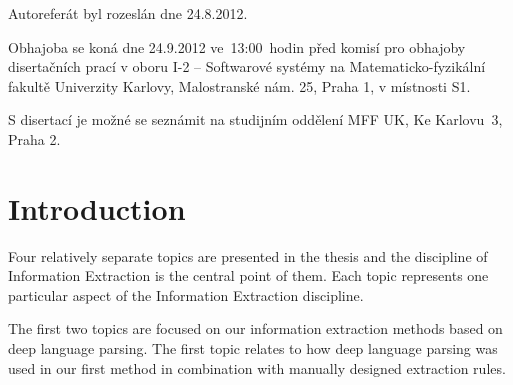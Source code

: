 \documentclass[12pt,a4paper,twoside,notitlepage]{article}
\begin{document}
\begin{tabular}{ll}
%
\end{tabular}

\vspace{4mm}

\noindent Autorefer\'{a}t byl rozesl\'{a}n dne 24.8.2012.

\noindent Obhajoba se kon\'{a} dne 24.9.2012 ve~13:00~hodin p\v{r}ed komis\'{i} pro obhajoby diserta\v{c}n\'{i}ch prac\'{i} v oboru I-2 -- Softwarov\'{e} syst\'{e}my na Matematicko-fyzik\'{a}ln\'{i} fakult\v{e} Univerzity Karlovy, Malostransk\'{e} n\'{a}m. 25, Praha 1, v m\'{i}stnosti S1.

\noindent S disertac\'{i} je mo\v{z}n\'{e} se sezn\'{a}mit na studijn\'{i}m odd\v{e}len\'{i} MFF UK, Ke Karlovu~3, Praha 2.


\cleardoublepage

\pagestyle{plain}
\setcounter{page}{5}


\section{Introduction}

\graphicspath{{../img/ch10/}}


Four relatively separate topics are presented in the thesis and the discipline of Information Extraction is the central point of them. Each topic represents one particular aspect of the Information Extraction discipline.

The first two topics are focused on our information extraction methods based on deep language parsing. The first topic relates to how deep language parsing was used in our first method in combination with manually designed extraction rules.
\end{document}

